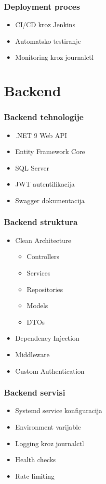 \documentclass[aspectratio=169]{beamer}
\begin{document}
\begin{frame}
    \frametitle{Deployment proces}
    \begin{itemize}
        \item CI/CD kroz Jenkins
        \item Automatsko testiranje
        \item Monitoring kroz journalctl
    \end{itemize}
\end{frame}

\section{Backend}

\begin{frame}
    \frametitle{Backend tehnologije}
    \begin{itemize}
        \item .NET 9 Web API
        \item Entity Framework Core
        \item SQL Server
        \item JWT autentifikacija
        \item Swagger dokumentacija
    \end{itemize}
\end{frame}

\begin{frame}
    \frametitle{Backend struktura}
    \begin{itemize}
        \item Clean Architecture
        \begin{itemize}
            \item Controllers
            \item Services
            \item Repositories
            \item Models
            \item DTOs
        \end{itemize}
        \item Dependency Injection
        \item Middleware
        \item Custom Authentication
    \end{itemize}
\end{frame}

\begin{frame}
    \frametitle{Backend servisi}
    \begin{itemize}
        \item Systemd service konfiguracija
        \item Environment varijable
        \item Logging kroz journalctl
        \item Health checks
        \item Rate limiting
    \end{itemize}
\end{frame}
\end{document}
